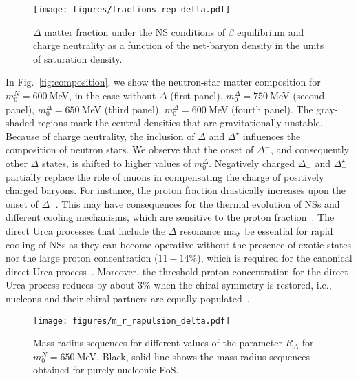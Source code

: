 \documentclass[preprint,showkeys,lengthcheck,nofootinbib,twocolumn,notitlepage,floatfix,superscriptaddress]{revtex4-1}
\begin{document}
\begin{figure}[t!]\centering
  \texttt{[image: figures/fractions\_rep\_delta.pdf]}
  \caption{$\Delta$ matter fraction under the NS conditions of $\beta$ equilibrium and charge neutrality as a function of the net-baryon density in the units of saturation density.}
  \label{fig:delta_rep_fraction}
\end{figure}

In Fig.~\ref{fig:composition}, we show the neutron-star matter composition for $m_0^N=600~$MeV, in the case without $\Delta$ (first panel), $m_0^\Delta=750~$MeV (second panel), $m_0^\Delta=650~$MeV (third panel), $m_0^\Delta=600~$MeV (fourth panel). The gray-shaded regions mark the central densities that are gravitationally unstable. Because of charge neutrality, the inclusion of $\Delta$ and $\Delta^\star$ influences the composition of neutron stars. We observe that the onset of $\Delta^-$, and consequently other $\Delta$ states, is shifted to higher values of $m_0^\Delta$. Negatively charged $\Delta_-$ and $\Delta_-^\star$ partially replace the role of muons in compensating the charge of positively charged baryons. For instance, the proton fraction drastically increases upon the onset of $\Delta_-$. This may have consequences for the thermal evolution of NSs and different cooling mechanisms, which are sensitive to the proton fraction~\cite{Klahn:2006ir}. The direct Urca processes that include the $\Delta$ resonance may be essential for rapid cooling of NSs as they can become operative without the presence of exotic states nor the large proton concentration ($11-14\%$), which is required for the canonical direct Urca process~\cite{Prakash:1992zng}. Moreover, the threshold proton concentration for the direct Urca process reduces by about 3\% when the chiral symmetry is restored, i.e., nucleons and their chiral partners are equally populated~\cite{Marczenko:2018jui}.


\begin{figure}[t!]\centering
  \texttt{[image: figures/m\_r\_rapulsion\_delta.pdf]}
  \caption{Mass-radius sequences for different values of the parameter $R_\Delta$ for $m_0^N=650~$MeV. Black, solid line shows the mass-radius sequences obtained for purely nucleonic EoS.}
  \label{fig:delta_rep_m_r}
\end{figure}


\end{document}
